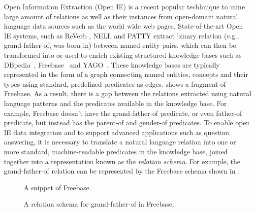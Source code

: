 Open Information Extraction (Open IE) is a recent popular techhnique
to mine large amount of relations  as well
as their instances from open-domain natural language
data sources such as the world wide web pages. 
State-of-the-art Open IE systems, such as ReVerb \cite{fader2011identifying},
NELL \cite{} and PATTY \cite{nakashole2012patty} extract binary 
relation (e.g., grand-father-of, was-born-in) between named entity pairs, 
which can then be transformed into or used to enrich existing structured
knowledge bases such as DBpedia~\cite{}, Freebase~\cite{} and YAGO~\cite{}.
These knowledge bases are typically represented in the form of a graph 
connecting named entities, concepts and their types using standard, predefined 
predicates as edges.  shows a fragment of
Freebase.  
As a result, there is a gap between the relations
extracted using natural language patterns and the predicates available in
the knowledge base. For example, Freebase doesn't have the grand-father-of
predicate, or even father-of predicate, but instead has the parent-of 
and gender-of predicates. To enable open IE data integration and to
support advanced applications such as question answering, it is necessary
to translate a natural language relation into one or more standard, 
machine-readable predicates in the knowledge base, joined together into a
representation known as the {\em relation schema}. For example,
the grand-father-of relation can be represented by the Freebase schema shown 
in .
 
\begin{figure}[th]
\caption{A snippet of Freebase.}
\label{fig:freebase}
\end{figure}


\begin{figure}[th]
\caption{A relation schema for grand-father-of in Freebase.}
\label{fig:grandpa}
\end{figure}



